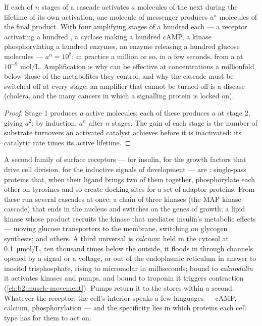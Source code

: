 \begin{theorem}\label{thm:b2:cell-signalling:amplification}
If each of $n$ stages of a cascade activates $a$ molecules of the
next during the lifetime of its own activation, one molecule of
messenger produces $a^{n}$ molecules of the final product. With
four amplifying stages of a hundred each --- a receptor activating a
hundred , a cyclase making a hundred cAMP, a kinase
phosphorylating a hundred enzymes, an enzyme releasing a hundred
glucose molecules --- $a^{n} = 10^{8}$; in practice a million or so,
in a few seconds, from a  at $10^{-9}$ mol/L. Amplification
is why  can be effective at concentrations a millionfold
below those of the metabolites they control, and why the cascade
must be switched off at every stage: an amplifier that cannot be
turned off is a disease (cholera, and the many cancers in which a
signalling protein is locked on).
\end{theorem}
\begin{proof}
Stage 1 produces $a$ active molecules; each of these produces $a$
at stage 2, giving $a^{2}$; by induction, $a^{n}$ after $n$ stages.
The gain of each stage is the number of substrate turnovers an
activated catalyst achieves before it is inactivated: its catalytic
rate times its active lifetime.
\end{proof}

\begin{proposition}\label{prop:b2:cell-signalling:rtk}
A second family of surface receptors --- for insulin, for the growth
factors that drive cell division, for the inductive signals of
development --- are \emph{}: single-pass
proteins that, when their ligand brings two of them together,
phosphorylate each other on tyrosines and so create docking sites
for a set of adaptor proteins. From these run several cascades at
once: a chain of three kinases (the MAP kinase cascade) that ends in
the nucleus and switches on the genes of growth; a lipid kinase
whose product recruits the kinase that mediates insulin's metabolic
effects --- moving glucose transporters to the membrane, switching
on glycogen synthesis; and others. A third universal  is \emph{calcium}: held in the cytosol at
\qty{0.1}{\micro mol/L}, ten thousand times below the outside, it
floods in through channels opened by a signal or a voltage, or out
of the endoplasmic reticulum in answer to inositol trisphosphate,
rising to micromolar in milliseconds; bound to \emph{calmodulin} it
activates kinases and pumps, and bound to troponin it triggers
contraction (\cref{ch:b2:muscle-movement}). Pumps return it to the
stores within a second. Whatever the receptor, the cell's interior
speaks a few languages --- cAMP, calcium, phosphorylation --- and the
specificity lies in which proteins each cell type has for them to
act on.
\end{proposition}

